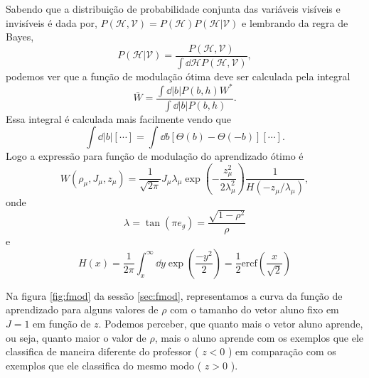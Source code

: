 Sabendo que a distribuição de probabilidade conjunta das variáveis
visíveis e invisíveis é dada por, $P\left(\mathcal{H},\mathcal{V}\right)=
P\left(\mathcal{H}\right)P\left(\mathcal{H}\left|\mathcal{V}\right.\right)$
e lembrando da regra de Bayes, 
\begin{equation}
  P \left(\mathcal{H}\left| \mathcal{V}\right. \right) 
  = \frac{P \left(\mathcal{H},\mathcal{V} \right)}
  { \int \dd \mathcal{H} P \left(\mathcal{H},\mathcal{V}\right)},
  \label{eq:BayesHV}
\end{equation}
podemos ver que a função de modulação ótima deve ser calculada pela integral
\begin{equation}
  \mathit{\bar{W}} = \frac{\int \dd \left|b\right| P \left( b, h \right) 
  \mathit{W}^* }{\int \dd \left|b\right| P \left( b, h \right)}.
  \label{eq:W_int}
\end{equation}
Essa integral  é calculada mais facilmente vendo que
\[
\int \dd \left|b\right| \left[\cdots \right] =
\int \dd b  \left[\Theta\left( b\right) - \Theta\left(-b\right) \right]
\left[\cdots \right].
\]
Logo a expressão para função de modulação do aprendizado ótimo é 
\begin{equation}
  \mathit{W}\left( \rho_\mu, J_\mu, z_\mu \right) 
  = \frac{1}{\sqrt{2\pi}}J_\mu \lambda_\mu 
  \exp\left(-\frac{z_\mu^2}{2\lambda_\mu^2} \right) 
  \frac{1}{H\left( - z_\mu/ \lambda_\mu \right)},
  \label{eq:W_final} 
\end{equation}
onde 
\begin{equation}
  \lambda = \tan\left(\pi e_g\right) = \frac{\sqrt{1- \rho^2 }}{ \rho}
  \label{eq:lamb}
\end{equation}
e
\begin{equation}
  H\left(x\right) = \frac{1}{2\pi}\int_x^\infty \dd y \exp(\frac{-y^2}{2}) 
  = \frac{1}{2}\mathrm{ercf}\left( \frac{x}{\sqrt{2}}\right)
\label{eq:ferr}
\end{equation}

Na figura \ref{fig:fmod} da sessão \ref{sec:fmod},  representamos a curva da
função de aprendizado para alguns valores de $\rho$ com o tamanho do vetor
aluno fixo em $J =1$ em função de $z$. Podemos perceber, que quanto mais
o vetor aluno aprende, ou seja, quanto maior o valor de $\rho$, mais o aluno
aprende com os exemplos que ele classifica de maneira diferente do professor
( $z < 0$ ) em comparação com os exemplos que ele classifica do mesmo modo
( $z>0$ ).



